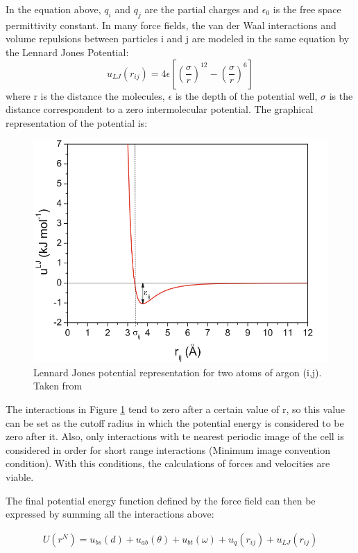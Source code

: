 In the equation above, $q_{i}$ and $q_{j}$ are the partial charges and  $\epsilon _{0}$ is the free space permittivity constant. In many force fields, the van der Waal interactions and volume repulsions between particles i and j are modeled in the same equation by the Lennard Jones Potential:
\begin{equation}
u_{LJ}(r_{ij}) = 4 \epsilon
\left[ \left(\frac{\sigma}{r} \right)^{12} - \left(\frac{\sigma}{r} \right)^{6} \right]
\end{equation}
where r is the distance the molecules, $\epsilon$ is the depth of the potential well, $\sigma$ is the distance correspondent to a zero intermolecular potential. The graphical representation of the potential is:
\begin{figure}[H]
	\centering
	\includegraphics[width=0.8\linewidth]{Figures/lj2}
	\caption{Lennard Jones potential representation for two atoms of argon (i,j). Taken from  }
	\label{fig:lj}
\end{figure}

The interactions in Figure \ref{fig:lj} tend to zero after a certain value of r, so this value can be set as the cutoff radius in which the potential energy is considered to be zero after it. Also, only interactions with te nearest periodic image of the cell is considered in order   for short range interactions (Minimum image convention condition). With this conditions, the calculations of forces and velocities are viable.

The final potential energy function defined by the force field can then be expressed by summing all the interactions above:

\begin{equation}
\begin{aligned}
U(r^N) = u_{bs}(d) + u_{ab}(\theta) + u_{bt}(\omega) + u_{q}(r_{ij}) + u_{LJ}(r_{ij})
\end{aligned}
\end{equation}
  

